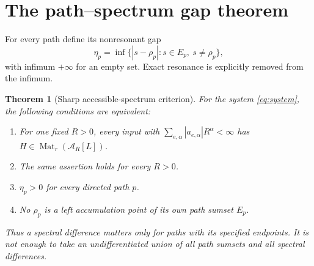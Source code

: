 \documentclass[11pt,a4paper]{article}
\numberwithin{equation}{section}
\newtheorem{theorem}{Theorem}[section]
\theoremstyle{definition}
\theoremstyle{remark}
\newcommand{\A}{\mathcal A}
\newcommand{\Mat}{\operatorname{Mat}}
\begin{document}
\section{The path--spectrum gap theorem}
\label{sec:gap}

For every path define its nonresonant gap
\begin{equation}\label{eq:gap}
 \eta_p=\inf\{|s-\rho_p|:s\in E_p,\ s\ne\rho_p\},
\end{equation}
with infimum $+\infty$ for an empty set. Exact resonance is explicitly
removed from the infimum.

\begin{theorem}[Sharp accessible-spectrum criterion]\label{thm:gap}
For the system \eqref{eq:system}, the following conditions are equivalent:
\begin{enumerate}[label=(\roman*)]
\item For one fixed $R>0$, every input with
      $\sum_{e,\alpha}|a_{e,\alpha}|R^\alpha<\infty$ has
      $H\in\Mat_r(\A_R[L])$.
\item The same assertion holds for every $R>0$.
\item $\eta_p>0$ for every directed path $p$.
\item No $\rho_p$ is a left accumulation point of its own path sumset
      $E_p$.
\end{enumerate}
Thus a spectral difference matters only for paths with its specified
endpoints. It is not enough to take an undifferentiated union of all path
sumsets and all spectral differences.
\end{theorem}
\end{document}

